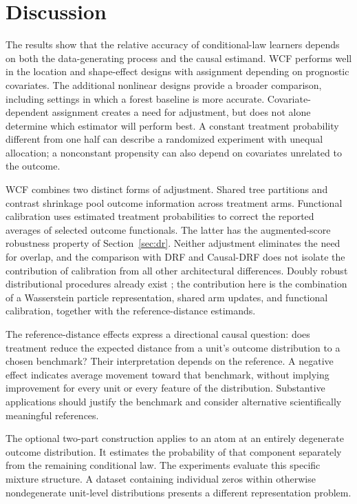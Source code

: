 \section{Discussion}\label{sec:discussion}

The results show that the relative accuracy of conditional-law learners depends on both the data-generating process and the causal estimand. WCF performs well in the location and shape-effect designs with assignment depending on prognostic covariates. The additional nonlinear designs provide a broader comparison, including settings in which a forest baseline is more accurate. Covariate-dependent assignment creates a need for adjustment, but does not alone determine which estimator will perform best. A constant treatment probability different from one half can describe a randomized experiment with unequal allocation; a nonconstant propensity can also depend on covariates unrelated to the outcome.

WCF combines two distinct forms of adjustment. Shared tree partitions and contrast shrinkage pool outcome information across treatment arms. Functional calibration uses estimated treatment probabilities to correct the reported averages of selected outcome functionals. The latter has the augmented-score robustness property of Section~\ref{sec:dr}. Neither adjustment eliminates the need for overlap, and the comparison with DRF and Causal-DRF does not isolate the contribution of calibration from all other architectural differences. Doubly robust distributional procedures already exist \citep{martineztaboada2023efficient,GRFDistributionalCausalEffects}; the contribution here is the combination of a Wasserstein particle representation, shared arm updates, and functional calibration, together with the reference-distance estimands.

The reference-distance effects express a directional causal question: does treatment reduce the expected distance from a unit's outcome distribution to a chosen benchmark? Their interpretation depends on the reference. A negative effect indicates average movement toward that benchmark, without implying improvement for every unit or every feature of the distribution. Substantive applications should justify the benchmark and consider alternative scientifically meaningful references.

The optional two-part construction applies to an atom at an entirely degenerate outcome distribution. It estimates the probability of that component separately from the remaining conditional law. The experiments evaluate this specific mixture structure. A dataset containing individual zeros within otherwise nondegenerate unit-level distributions presents a different representation problem.

